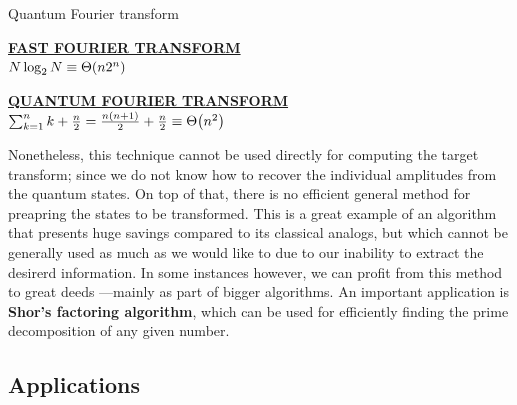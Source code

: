 \documentclass[9pt, handout, aspectratio=169]{beamer}	%
\begin{document}
\begin{frame}[allowframebreaks]{Quantum Fourier transform}
	\begin{multicols}{2}
	\begin{centering}

		\underline{\textbf{FAST FOURIER TRANSFORM}}\\
		\medskip
		$N\log_2 N \equiv \Theta\qty(n2^n)$

		\columnbreak

		\underline{\textbf{QUANTUM FOURIER TRANSFORM}}\\
		\medskip
		$\sum_{k=1}^{n}k + \frac{n}{2} =
			\frac{n\qty(n+1)}{2} + \frac{n}{2} \equiv \Theta\qty(n^2)$

	\end{centering}
	\end{multicols}

	Nonetheless, this technique cannot be used directly for computing the target transform; since we do not know how to recover the individual amplitudes from the quantum states. On top of that, there is no efficient general method for preapring the states to be transformed. This is a great example of an algorithm that presents huge savings compared to its classical analogs, but which cannot be generally used as much as we would like to due to our inability to extract the desirerd information. In some instances however, we can profit from this method to great deeds ---mainly as part of bigger algorithms. An important application is \textbf{Shor's factoring algorithm}, which can be used for efficiently finding the prime decomposition of any given number.

\end{frame}


\subsection{Applications}
\end{document}
